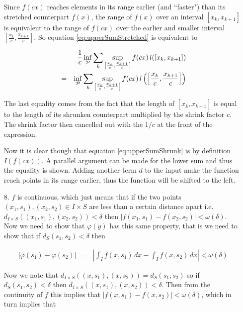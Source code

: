 \documentclass[oneside]{book}
\begin{document}
\begin{enumerate}
Since $f(cx)$ reaches elements in its range earlier (and ``faster") than its stretched counterpart $f(x)$, the range of $f(x)$ over an interval $[x_k,x_{k+1}]$ is equivalent to the range of $f(cx)$ over the earlier and smaller interval $\left[\frac{x_k}{c},\frac{x_{k+1}}{c}\right]$. So equation \ref{eq:upperSumStretched} is equivalent to

\begin{eqnarray}
\label{eq:upperSumShrunk}
&& \frac{1}{c} \inf_{\cal{P}} \sum_{k} \sup_{\left[\frac{x_k}{c},\frac{x_{k+1}}{c}\right]} f(cx)\, l([x_k,x_{k+1}]) \nonumber \\
&=& \inf_{\cal{P}} \sum_{k} \sup_{\left[\frac{x_k}{c},\frac{x_{k+1}}{c}\right]} f(cx)\, l\left(\left[\frac{x_k}{c},\frac{x_{k+1}}{c}\right]\right)
\end{eqnarray}

The last equality comes from the fact that the length of $[x_k,x_{k+1}]$ is equal to the length of its shrunken counterpart multiplied by the shrink factor $c$. The shrink factor then cancelled out with the $1/c$ at the front of the expression.

Now it is clear though that equation \ref{eq:upperSumShrunk} is by definition $\bar{I}(f(cx))$. A parallel argument can be made for the lower sum and thus the equality is shown. Adding another term $d$ to the input make the function reach points in its range earlier, thus the function will be shifted to the left.

\item[8.] $f$ is continuous, which just means that if the two points \\$(x_1,s_1),(x_2,s_2) \in I \times S$ are less than a certain distance apart i.e. $d_{I \times S}((x_1,s_1),(x_2,s_2)) < \delta$ then $| f(x_1,s_1)-f(x_2,s_2) | < \omega(\delta)$. Now we need to show that $\varphi(y)$ has this same property, that is we need to show that if $d_S(s_1,s_2) < \delta$ then

\begin{eqnarray}
\label{eq:phiContinuous}
\left| \varphi(s_1) - \varphi(s_2) \right| &=& \left| \int_I f(x,s_1)\, dx - \int_I f(x,s_2)\, dx \right | < \omega(\delta)
\end{eqnarray}

Now we note that $d_{I \times S}((x,s_1),(x,s_2))=d_S(s_1,s_2)$ so if $d_S(s_1,s_2) < \delta$ then $d_{I \times S}((x,s_1),(x,s_2))< \delta$. Then from the continuity of $f$ this implies that $|f(x,s_1)-f(x,s_2)| < \omega(\delta)$, which in turn implies that


\end{enumerate}
\end{document}
